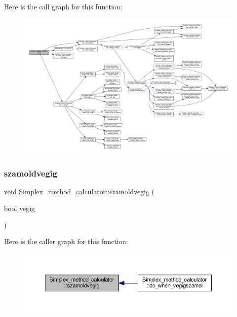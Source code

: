 Here is the call graph for this function\+:\nopagebreak
\begin{figure}[H]
\begin{center}
\leavevmode
\includegraphics[width=350pt]{classSimplex__method__calculator_acad83ff8660c546cad0f097a500a21fb_cgraph}
\end{center}
\end{figure}
\mbox{\label{classSimplex__method__calculator_a144e4f03c601f1eec42738dfe555f23e}} 
\subsubsection{\texorpdfstring{szamoldvegig}{szamoldvegig}}
{\footnotesize\ttfamily void Simplex\+\_\+method\+\_\+calculator\+::szamoldvegig (\begin{DoxyParamCaption}\item[{bool}]{vegig }\end{DoxyParamCaption})\hspace{0.3cm}{\ttfamily [signal]}}

Here is the caller graph for this function\+:\nopagebreak
\begin{figure}[H]
\begin{center}
\leavevmode
\includegraphics[width=350pt]{classSimplex__method__calculator_a144e4f03c601f1eec42738dfe555f23e_icgraph}
\end{center}
\end{figure}
\mbox{\label{classSimplex__method__calculator_ae8f41cf2c4b813322d238b3f0ed5d415}} 
